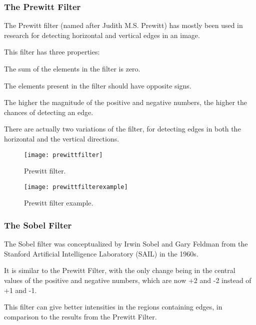 	\subsubsection{The Prewitt Filter}
	\begin{bulletedlist}
		\item The Prewitt filter (named after Judith M.S. Prewitt) has mostly been used in research for detecting horizontal and vertical edges in an image.
		\item This filter has three properties:
		\begin{bulletedlist}
			\item The sum of the elements in the filter is zero.
			\item The elements present in the filter should have opposite signs.
			\item The higher the magnitude of the positive and negative numbers, the higher the chances of detecting an edge.
		\end{bulletedlist}
		\item There are actually two variations of the filter, for detecting edges in both the horizontal and the vertical
directions.
	\end{bulletedlist}

	\begin{figure}[htb]
		\centering
		\texttt{[image: prewittfilter]}
		\caption[Prewitt filter]{Prewitt filter.}
		\label{fig:prewittfilter}
	\end{figure}
	\begin{figure}[htb]
		\centering
		\texttt{[image: prewittfilterexample]}
		\caption[Prewitt filter example]{Prewitt filter example.}
		\label{fig:prewittfilterexample}
	\end{figure}

	\subsubsection{The Sobel Filter}
	\begin{bulletedlist}
		\item The Sobel filter was conceptualized by Irwin Sobel and Gary Feldman from the Stanford Artificial Intelligence Laboratory (SAIL) in the 1960s.
		\item It is similar to the Prewitt Filter, with the only change being in the central values of the positive and negative numbers, which are now +2 and -2 instead of +1 and -1.
		\item This filter can give better intensities in the regions containing edges, in comparison to the results from the Prewitt Filter.
	\end{bulletedlist}

